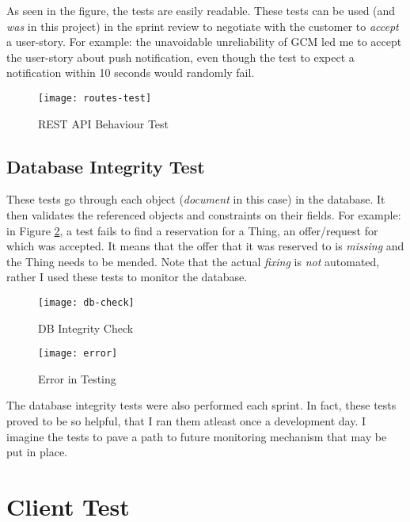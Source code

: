As seen in the figure, the tests are easily readable. These tests can be used (and \textit{was} in this project) in the sprint review to negotiate with the customer to \textit{accept} a user-story. For example: the unavoidable unreliability of GCM led me to accept the user-story about push notification, even though the test to expect a notification within 10 seconds would randomly fail.

\begin{figure}[!h]
    \centering
    \texttt{[image: routes-test]}
    \caption{REST API Behaviour Test}
    \label{fig:rest-test}
\end{figure}

\subsection{Database Integrity Test}

These tests go through each object (\textit{document} in this case) in the database. It then validates the referenced objects and constraints on their fields. For example: in Figure \ref{fig:db-test}, a test fails to find a reservation for a Thing, an offer/request for which was accepted. It means that the offer that it was reserved to is \textit{missing} and the Thing needs to be mended. Note that the actual \textit{fixing} is \textit{not} automated, rather I used these tests to monitor the database.

\begin{figure}[!h]
    \centering
    \texttt{[image: db-check]}
    \caption{DB Integrity Check}
    \label{fig:db-test}
\end{figure}

\begin{figure}[!h]
    \centering
    \texttt{[image: error]}
    \caption{Error in Testing}
    \label{fig:error}
\end{figure}

The database integrity tests were also performed each sprint. In fact, these tests proved to be so helpful, that I ran them atleast once a development day. I imagine the tests to pave a path to future monitoring mechanism that may be put in place.\\

\section{Client Test}

